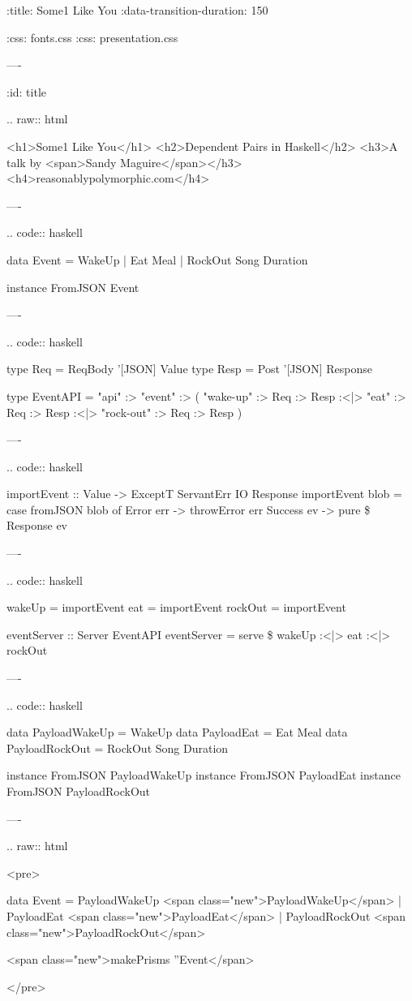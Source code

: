 :title: Some1 Like You
:data-transition-duration: 150

:css: fonts.css
:css: presentation.css

\newcommand{\todo}[2]{#2}
\newcommand{\note}[1]{<span class="new">#1</span>}
\newcommand{\hs}[1]{.. code:: haskell
#1
}
\newcommand{\code}[1]{.. raw:: html

  <pre>
#1
  </pre>
}

----

:id: title

.. raw:: html

  <h1>Some1 Like You</h1>
  <h2>Dependent Pairs in Haskell</h2>
  <h3>A talk by <span>Sandy Maguire</span></h3>
  <h4>reasonablypolymorphic.com</h4>

----

\hs{
  data Event = WakeUp
             | Eat Meal
             | RockOut Song Duration

  instance FromJSON Event
}

----

\hs{
  type Req  = ReqBody '[JSON] Value
  type Resp = Post    '[JSON] Response

  type EventAPI = "api" :> "event" :>
         ( "wake-up"  :> Req :> Resp
      :<|> "eat"      :> Req :> Resp
      :<|> "rock-out" :> Req :> Resp
         )
}

----

\hs{
  importEvent :: Value -> ExceptT ServantErr IO Response
  importEvent blob =
    case fromJSON blob of
      Error   err -> throwError err
      Success ev  -> pure \$ Response ev
}

----

\hs{
  wakeUp  = importEvent
  eat     = importEvent
  rockOut = importEvent

  eventServer :: Server EventAPI
  eventServer = serve \todo{fix dollar signs}{\$}
    wakeUp :<|> eat :<|> rockOut
}

----

\hs{
  data PayloadWakeUp  = \todo{rename these so they dont clash with datakinds later}{WakeUp}
  data PayloadEat     = Eat Meal
  data PayloadRockOut = RockOut Song Duration

  instance FromJSON PayloadWakeUp
  instance FromJSON PayloadEat
  instance FromJSON PayloadRockOut
}

----

\code{
  data Event = PayloadWakeUp  \note{PayloadWakeUp}
             | PayloadEat     \note{PayloadEat}
             | PayloadRockOut \note{PayloadRockOut}

  \note{makePrisms ''Event}
}

